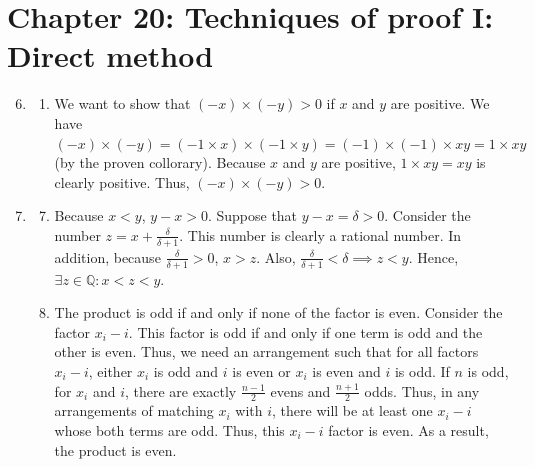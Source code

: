 \documentclass{article}
\begin{document}
\section*{Chapter 20: Techniques of proof I: Direct method}
\begin{enumerate}[label=20.\arabic*]
    \setcounter{enumi}{5}
  \item
    \begin{enumerate}[label=(\roman*)]
      \item We want to show that $(-x)\times(-y)>0$ if $x$ and $y$ are positive. We have $(-x)
        \times(-y) = (-1 \times x)\times(-1 \times y) = (-1)\times(-1) \times xy = 1
        \times xy$ (by the proven collorary). Because $x$ and $y$ are positive, $1 \times
        xy = xy$ is clearly positive. Thus, $(-x)\times(-y)>0$.
    \end{enumerate}
    \setcounter{enumi}{13}
  \item
    \begin{enumerate}[label=(\roman*)]
        \setcounter{enumii}{6}
      \item Because $x<y$, $y-x>0$. Suppose that $y-x=\delta>0$. Consider the number $z=x+\frac
        {\delta}{\delta+1}$. This number is clearly a rational number. In addition,
        because $\frac{\delta}{\delta+1}>0$, $x > z$. Also, $\frac{\delta}{\delta+1}<\delta
        \implies z < y$. Hence, $\exists z\in\mathbb{Q}: x<z<y$.
        \setcounter{enumii}{9}
      \item The product is odd if and only if none of the factor is even. Consider the factor
        $x_i-i$. This factor is odd if and only if one term is odd and the other is even.
        Thus, we need an arrangement such that for all factors $x_i-i$, either $x_i$ is odd
        and $i$ is even or $x_i$ is even and $i$ is odd. If $n$ is odd, for $x_i$ and $i$,
        there are exactly $\frac{n-1}{2}$ evens and $\frac{n+1}{2}$ odds. Thus, in any
        arrangements of matching $x_i$ with $i$, there will be at least one $x_i-i$ whose
        both terms are odd. Thus, this $x_i-i$ factor is even. As a result, the product is
        even.
    \end{enumerate}
\end{enumerate}
\end{document}
